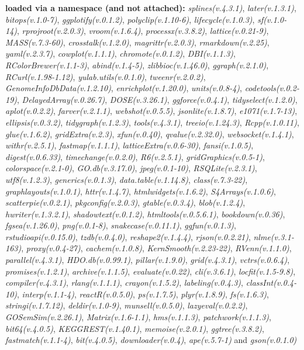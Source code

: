 \documentclass[
]{book}
\begin{document}
\textbf{loaded via a namespace (and not attached):}
\emph{splines(v.4.3.1)}, \emph{later(v.1.3.1)}, \emph{bitops(v.1.0-7)}, \emph{ggplotify(v.0.1.2)}, \emph{polyclip(v.1.10-6)}, \emph{lifecycle(v.1.0.3)}, \emph{sf(v.1.0-14)}, \emph{rprojroot(v.2.0.3)}, \emph{vroom(v.1.6.4)}, \emph{processx(v.3.8.2)}, \emph{lattice(v.0.21-9)}, \emph{MASS(v.7.3-60)}, \emph{crosstalk(v.1.2.0)}, \emph{magrittr(v.2.0.3)}, \emph{rmarkdown(v.2.25)}, \emph{yaml(v.2.3.7)}, \emph{cowplot(v.1.1.1)}, \emph{chromote(v.0.1.2)}, \emph{DBI(v.1.1.3)}, \emph{RColorBrewer(v.1.1-3)}, \emph{abind(v.1.4-5)}, \emph{zlibbioc(v.1.46.0)}, \emph{ggraph(v.2.1.0)}, \emph{RCurl(v.1.98-1.12)}, \emph{yulab.utils(v.0.1.0)}, \emph{tweenr(v.2.0.2)}, \emph{GenomeInfoDbData(v.1.2.10)}, \emph{enrichplot(v.1.20.0)}, \emph{units(v.0.8-4)}, \emph{codetools(v.0.2-19)}, \emph{DelayedArray(v.0.26.7)}, \emph{DOSE(v.3.26.1)}, \emph{ggforce(v.0.4.1)}, \emph{tidyselect(v.1.2.0)}, \emph{aplot(v.0.2.2)}, \emph{farver(v.2.1.1)}, \emph{webshot(v.0.5.5)}, \emph{jsonlite(v.1.8.7)}, \emph{e1071(v.1.7-13)}, \emph{ellipsis(v.0.3.2)}, \emph{tidygraph(v.1.2.3)}, \emph{tools(v.4.3.1)}, \emph{treeio(v.1.24.3)}, \emph{Rcpp(v.1.0.11)}, \emph{glue(v.1.6.2)}, \emph{gridExtra(v.2.3)}, \emph{xfun(v.0.40)}, \emph{qvalue(v.2.32.0)}, \emph{websocket(v.1.4.1)}, \emph{withr(v.2.5.1)}, \emph{fastmap(v.1.1.1)}, \emph{latticeExtra(v.0.6-30)}, \emph{fansi(v.1.0.5)}, \emph{digest(v.0.6.33)}, \emph{timechange(v.0.2.0)}, \emph{R6(v.2.5.1)}, \emph{gridGraphics(v.0.5-1)}, \emph{colorspace(v.2.1-0)}, \emph{GO.db(v.3.17.0)}, \emph{jpeg(v.0.1-10)}, \emph{RSQLite(v.2.3.1)}, \emph{utf8(v.1.2.3)}, \emph{generics(v.0.1.3)}, \emph{data.table(v.1.14.8)}, \emph{class(v.7.3-22)}, \emph{graphlayouts(v.1.0.1)}, \emph{httr(v.1.4.7)}, \emph{htmlwidgets(v.1.6.2)}, \emph{S4Arrays(v.1.0.6)}, \emph{scatterpie(v.0.2.1)}, \emph{pkgconfig(v.2.0.3)}, \emph{gtable(v.0.3.4)}, \emph{blob(v.1.2.4)}, \emph{hwriter(v.1.3.2.1)}, \emph{shadowtext(v.0.1.2)}, \emph{htmltools(v.0.5.6.1)}, \emph{bookdown(v.0.36)}, \emph{fgsea(v.1.26.0)}, \emph{png(v.0.1-8)}, \emph{snakecase(v.0.11.1)}, \emph{ggfun(v.0.1.3)}, \emph{rstudioapi(v.0.15.0)}, \emph{tzdb(v.0.4.0)}, \emph{reshape2(v.1.4.4)}, \emph{rjson(v.0.2.21)}, \emph{nlme(v.3.1-163)}, \emph{proxy(v.0.4-27)}, \emph{cachem(v.1.0.8)}, \emph{KernSmooth(v.2.23-22)}, \emph{RVenn(v.1.1.0)}, \emph{parallel(v.4.3.1)}, \emph{HDO.db(v.0.99.1)}, \emph{pillar(v.1.9.0)}, \emph{grid(v.4.3.1)}, \emph{vctrs(v.0.6.4)}, \emph{promises(v.1.2.1)}, \emph{archive(v.1.1.5)}, \emph{evaluate(v.0.22)}, \emph{cli(v.3.6.1)}, \emph{locfit(v.1.5-9.8)}, \emph{compiler(v.4.3.1)}, \emph{rlang(v.1.1.1)}, \emph{crayon(v.1.5.2)}, \emph{labeling(v.0.4.3)}, \emph{classInt(v.0.4-10)}, \emph{interp(v.1.1-4)}, \emph{reactR(v.0.5.0)}, \emph{ps(v.1.7.5)}, \emph{plyr(v.1.8.9)}, \emph{fs(v.1.6.3)}, \emph{stringi(v.1.7.12)}, \emph{deldir(v.1.0-9)}, \emph{munsell(v.0.5.0)}, \emph{lazyeval(v.0.2.2)}, \emph{GOSemSim(v.2.26.1)}, \emph{Matrix(v.1.6-1.1)}, \emph{hms(v.1.1.3)}, \emph{patchwork(v.1.1.3)}, \emph{bit64(v.4.0.5)}, \emph{KEGGREST(v.1.40.1)}, \emph{memoise(v.2.0.1)}, \emph{ggtree(v.3.8.2)}, \emph{fastmatch(v.1.1-4)}, \emph{bit(v.4.0.5)}, \emph{downloader(v.0.4)}, \emph{ape(v.5.7-1)} and \emph{gson(v.0.1.0)}
\end{document}
